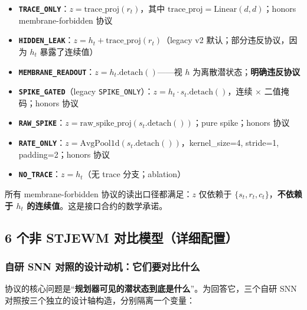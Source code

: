 \documentclass[11pt,a4paper]{article}
\begin{document}
\begin{itemize}[leftmargin=2em]
    \item \textbf{\texttt{TRACE\_ONLY}}：$z = \text{trace\_proj}(r_t)$，其中 $\text{trace\_proj} = \text{Linear}(d, d)$；honors membrane-forbidden 协议
    \item \textbf{\texttt{HIDDEN\_LEAK}}：$z = h_t + \text{trace\_proj}(r_t)$（legacy v2 默认；部分违反协议，因为 $h_t$ 暴露了连续值）
    \item \textbf{\texttt{MEMBRANE\_READOUT}}：$z = h_t.\text{detach}()$——视 $h$ 为离散潜状态；\textbf{明确违反协议}
    \item \textbf{\texttt{SPIKE\_GATED}}（legacy \texttt{SPIKE\_ONLY}）：$z = h_t \cdot s_t.\text{detach}()$，连续 $\times$ 二值掩码；honors 协议
    \item \textbf{\texttt{RAW\_SPIKE}}：$z = \text{raw\_spike\_proj}(s_t.\text{detach}())$；pure spike；honors 协议
    \item \textbf{\texttt{RATE\_ONLY}}：$z = \text{AvgPool1d}(s_t.\text{detach}())$，kernel\_size=4, stride=1, padding=2；honors 协议
    \item \textbf{\texttt{NO\_TRACE}}：$z = h_t$（无 trace 分支；ablation）
\end{itemize}

所有 membrane-forbidden 协议的读出口径都满足：$z$ 仅依赖于 $\{s_t, r_t, c_t\}$，\textbf{不依赖于 $h_t$ 的连续值}。这是接口合约的数学承诺。

\subsection{6 个非 STJEWM 对比模型（详细配置）}

\subsubsection{自研 SNN 对照的设计动机：它们要对比什么}

协议的核心问题是“\textbf{规划器可见的潜状态到底是什么}”。为回答它，三个自研 SNN 对照按三个独立的设计轴构造，分别隔离一个变量：
\end{document}
